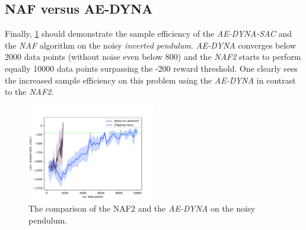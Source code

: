 \documentclass[
reprint,
amsmath,amssymb,amsfonts,clevref,
aps,
prstab,
]{revtex4-2}
\begin{document}
\subsection{NAF versus AE-DYNA}
	Finally, \cref{fig:comparsion_NAF_AE-DYNA} should demonstrate the sample efficiency of the \emph{AE-DYNA-SAC} and the \emph{NAF} algorithm on the noisy \emph{inverted pendulum}. \emph{AE-DYNA} converges below 2000 data points (without noise even below 800) and the \emph{NAF2} starts to perform equally 10000 data points surpassing the -200 reward threshold. One clearly sees the increased sample efficiency on this problem using the \emph{AE-DYNA} in contrast to the \emph{NAF2}.
		\begin{figure}[!h]
		\centering
		\includegraphics*[width=0.5\textwidth]{Figures/Comparison_NAF_ae_dyna}
		\caption{The comparison of the NAF2 and the \emph{AE-DYNA} on the noisy pendulum.}
		\label{fig:comparsion_NAF_AE-DYNA}
	\end{figure}

\end{document}
